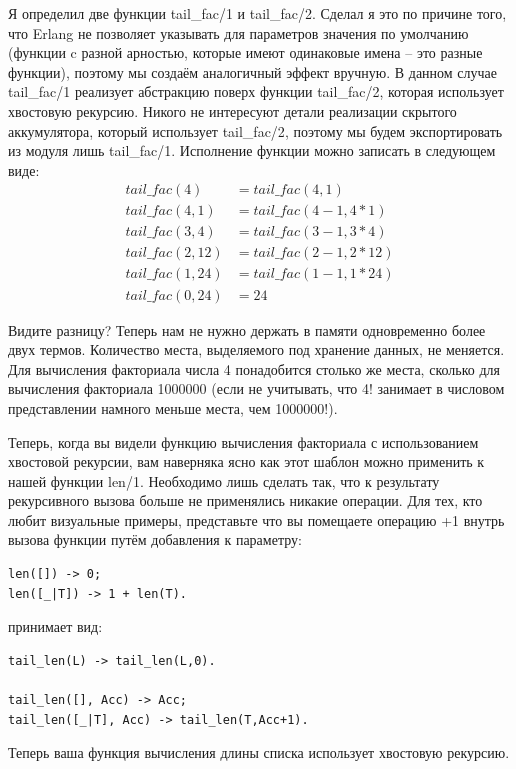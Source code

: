 \documentclass[a4paper,12pt]{report}
\newcommand{\ops}{\colorbox{lgreen}}
\begin{document}
Я определил две функции \ops{tail\_fac/1} и \ops{tail\_fac/2}. Сделал я это по причине того, что Erlang не позволяет указывать для параметров значения по умолчанию (функции c разной арностью, которые имеют одинаковые имена \--- это разные функции), поэтому мы создаём аналогичный эффект вручную. В данном случае \ops{tail\_fac/1} реализует абстракцию поверх функции \ops{tail\_fac/2}, которая использует хвостовую рекурсию. Никого не интересуют детали реализации скрытого аккумулятора, который использует \ops{tail\_fac/2}, поэтому мы будем экспортировать из модуля лишь \ops{tail\_fac/1}. Исполнение функции можно записать в следующем виде:
\begin{align*}
tail\_fac(4) &= tail\_fac(4,1)\\
tail\_fac(4,1) &= tail\_fac(4-1, 4*1)\\
tail\_fac(3,4) &= tail\_fac(3-1, 3*4)\\
tail\_fac(2,12) &= tail\_fac(2-1,2*12)\\
tail\_fac(1,24) &= tail\_fac(1-1, 1*24)\\
tail\_fac(0,24) &= 24
\end{align*}

Видите разницу? Теперь нам не нужно держать в памяти одновременно более двух термов. Количество места, выделяемого под хранение данных, не меняется. Для вычисления факториала числа 4 понадобится столько же места, сколько для вычисления факториала 1000000 (если не учитывать, что 4! занимает в числовом представлении намного меньше места, чем 1000000!).

Теперь, когда вы видели функцию вычисления факториала с использованием хвостовой рекурсии, вам наверняка ясно как этот шаблон можно применить к нашей функции \ops{len/1}. Необходимо лишь сделать так, что к результату рекурсивного вызова больше не применялись никакие операции. Для тех, кто любит визуальные примеры, представьте что вы помещаете операцию \ops{+1} внутрь вызова функции путём добавления к параметру:
\begin{lstlisting}[style=erlang]
len([]) -> 0;
len([_|T]) -> 1 + len(T).
\end{lstlisting}
принимает вид:
\begin{lstlisting}[style=erlang]
tail_len(L) -> tail_len(L,0).
 
tail_len([], Acc) -> Acc;
tail_len([_|T], Acc) -> tail_len(T,Acc+1).
\end{lstlisting}

Теперь ваша функция вычисления длины списка использует хвостовую рекурсию.
\end{document}
